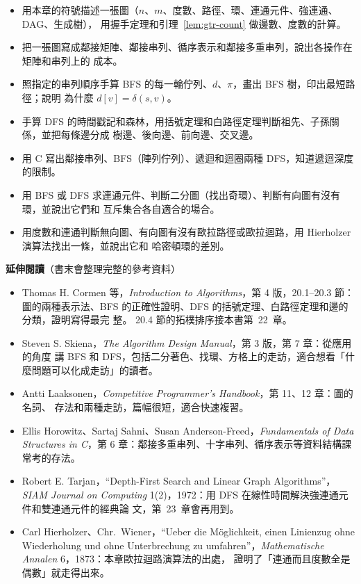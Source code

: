 \begin{itemize}
\item 用本章的符號描述一張圖（$n$、$m$、度數、路徑、環、連通元件、強連通、DAG、生成樹），
用握手定理和引理~\ref{lem:gtr-count} 做邊數、度數的計算。
\item 把一張圖寫成鄰接矩陣、鄰接串列、循序表示和鄰接多重串列，說出各操作在矩陣和串列上的
成本。
\item 照指定的串列順序手算 BFS 的每一輪佇列、$d$、$\pi$，畫出 BFS 樹，印出最短路徑；說明
為什麼 $d[v] = \delta(s, v)$。
\item 手算 DFS 的時間戳記和森林，用括號定理和白路徑定理判斷祖先、子孫關係，並把每條邊分成
樹邊、後向邊、前向邊、交叉邊。
\item 用 C 寫出鄰接串列、BFS（陣列佇列）、遞迴和迴圈兩種 DFS，知道遞迴深度的限制。
\item 用 BFS 或 DFS 求連通元件、判斷二分圖（找出奇環）、判斷有向圖有沒有環，並說出它們和
互斥集合各自適合的場合。
\item 用度數和連通判斷無向圖、有向圖有沒有歐拉路徑或歐拉迴路，用 Hierholzer 演算法找出一條，並說出它和
哈密頓環的差別。
\end{itemize}

\textbf{延伸閱讀}（書末會整理完整的參考資料）

\begin{itemize}
\item Thomas H. Cormen 等，\textit{Introduction to Algorithms}，第 4 版，20.1--20.3 節：
圖的兩種表示法、BFS 的正確性證明、DFS 的括號定理、白路徑定理和邊的分類，證明寫得最完
整。 20.4 節的拓樸排序接本書第~22~章。
\item Steven S. Skiena，\textit{The Algorithm Design Manual}，第 3 版，第 7 章：從應用的角度
講 BFS 和 DFS，包括二分著色、找環、方格上的走訪，適合想看「什麼問題可以化成走訪」的讀者。
\item Antti Laaksonen，\textit{Competitive Programmer's Handbook}，第 11、12 章：圖的名詞、
存法和兩種走訪，篇幅很短，適合快速複習。
\item Ellis Horowitz、Sartaj Sahni、Susan Anderson-Freed，\textit{Fundamentals of Data
Structures in C}，第 6 章：鄰接多重串列、十字串列、循序表示等資料結構課常考的存法。
\item Robert E. Tarjan，``Depth-First Search and Linear Graph Algorithms''，\textit{SIAM
Journal on Computing} 1(2)，1972：用 DFS 在線性時間解決強連通元件和雙連通元件的經典論
文，第~23~章會再用到。
\item Carl Hierholzer、Chr.~Wiener，``Ueber die M\"oglichkeit, einen Linienzug ohne Wiederholung und
ohne Unterbrechung zu umfahren''，\textit{Mathematische Annalen} 6，1873：本章歐拉迴路演算法的出處，
證明了「連通而且度數全是偶數」就走得出來。
\end{itemize}

